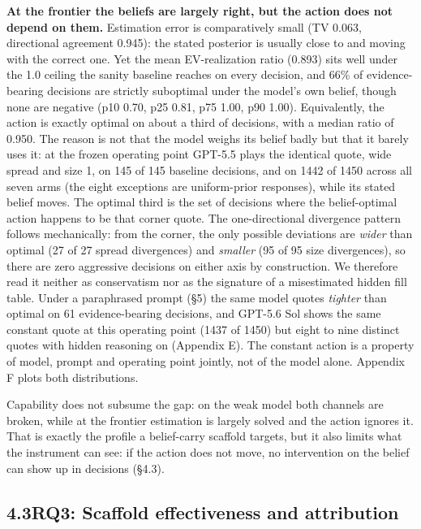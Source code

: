 \documentclass[
  10pt,
]{article}
\newcounter{none} %
\begin{document}
\textbf{At the frontier the beliefs are largely right, but the action does not depend on them.} Estimation error is comparatively small (TV 0.063, directional agreement 0.945): the stated posterior is usually close to and moving with the correct one. Yet the mean EV-realization ratio (0.893) sits well under the 1.0 ceiling the sanity baseline reaches on every decision, and 66\% of evidence-bearing decisions are strictly suboptimal under the model's own belief, though none are negative (p10 0.70, p25 0.81, p75 1.00, p90 1.00). Equivalently, the action is exactly optimal on about a third of decisions, with a median ratio of 0.950. The reason is not that the model weighs its belief badly but that it barely uses it: at the frozen operating point GPT-5.5 plays the identical quote, wide spread and size 1, on 145 of 145 baseline decisions, and on 1442 of 1450 across all seven arms (the eight exceptions are uniform-prior responses), while its stated belief moves. The optimal third is the set of decisions where the belief-optimal action happens to be that corner quote. The one-directional divergence pattern follows mechanically: from the corner, the only possible deviations are \emph{wider} than optimal (27 of 27 spread divergences) and \emph{smaller} (95 of 95 size divergences), so there are zero aggressive decisions on either axis by construction. We therefore read it neither as conservatism nor as the signature of a misestimated hidden fill table. Under a paraphrased prompt (§5) the same model quotes \emph{tighter} than optimal on 61 evidence-bearing decisions, and GPT-5.6 Sol shows the same constant quote at this operating point (1437 of 1450) but eight to nine distinct quotes with hidden reasoning on (Appendix E). The constant action is a property of model, prompt and operating point jointly, not of the model alone. Appendix F plots both distributions.

Capability does not subsume the gap: on the weak model both channels are broken, while at the frontier estimation is largely solved and the action ignores it. That is exactly the profile a belief-carry scaffold targets, but it also limits what the instrument can see: if the action does not move, no intervention on the belief can show up in decisions (§4.3).

\subsection{4.3\quad RQ3: Scaffold effectiveness and attribution}\label{rq3-scaffold-effectiveness-and-attribution}
\end{document}
